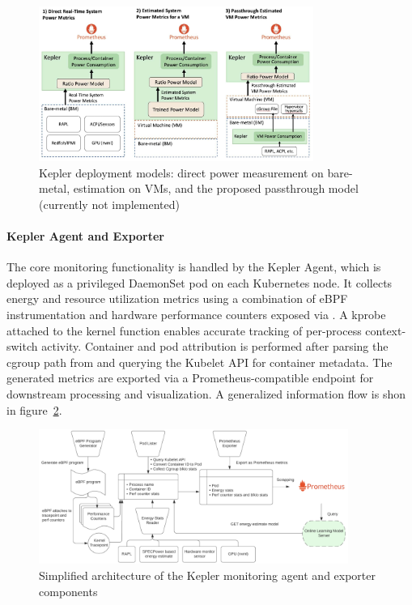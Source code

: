 \begin{figure}[ht]
  \centering
  \includegraphics[width=0.8\textwidth]{Figures/kepler_deployment_modes.jpg}
  \caption{Kepler deployment models: direct power measurement on bare-metal, estimation on VMs, and the proposed passthrough model (currently not implemented)\parencite{kepler_docs}}
  \label{fig:kepler-deployment-modes}
\end{figure}

\paragraph{Kepler Agent and Exporter}
The core monitoring functionality is handled by the Kepler Agent, which is deployed as a privileged DaemonSet pod on each Kubernetes node. It collects energy and resource utilization metrics using a combination of eBPF instrumentation and hardware performance counters exposed via . A kprobe attached to the  kernel function enables accurate tracking of per-process context-switch activity. Container and pod attribution is performed after parsing the cgroup path from  and querying the Kubelet API for container metadata. The generated metrics are exported via a Prometheus-compatible endpoint for downstream processing and visualization. A generalized information flow is shon in figure~\ref{fig:kepler-architecture}.

\begin{figure}[ht]
  \centering
  \includegraphics[width=0.9\textwidth]{Figures/kepler_architecture.png}
  \caption{Simplified architecture of the Kepler monitoring agent and exporter components\parencite{kepler_docs}}
  \label{fig:kepler-architecture}
\end{figure}


